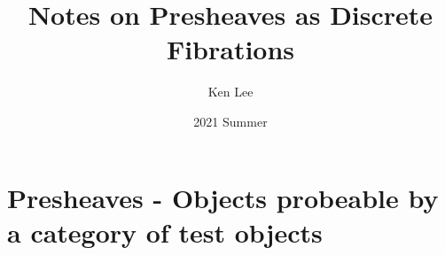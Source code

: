 \documentclass{article}
\begin{document}
\title{Notes on Presheaves as Discrete Fibrations}

\author{Ken Lee}
\date{2021 Summer}
\maketitle
\tableofcontents


\section{Presheaves - Objects probeable by a category of test objects}

\begin{rmk}
  

\end{rmk}
\end{document}
